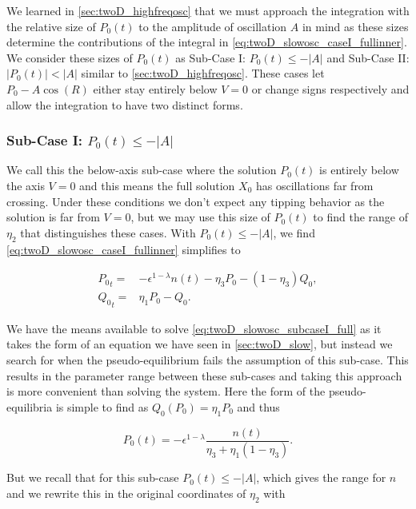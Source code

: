 We learned in \autoref{sec:twoD_highfreqosc} that we must approach the integration with the relative size of $P_0(t)$ to the amplitude of oscillation $A$ in mind as these sizes determine the contributions of the integral in \eqref{eq:twoD_slowosc_caseI_fullinner}. We consider these sizes of $P_0(t)$ as Sub-Case I: $P_0(t)\le -|A|$ and Sub-Case II:$|P_0(t)|<|A|$ similar to \autoref{sec:twoD_highfreqosc}. These cases let $P_0-A\cos(R)$ either stay entirely below $V=0$ or change signs respectively and allow the integration to have two distinct forms.

\subsubsection{Sub-Case I: $P_0(t)\le -|A|$}

We call this the below-axis sub-case where the solution $P_0(t)$ is entirely below the axis $V=0$ and this means the full solution $X_0$ has oscillations far from crossing. Under these conditions we don't expect any tipping behavior as the solution is far from $V=0$, but we may use this size of $P_0(t)$ to find the range of $\eta_2$ that distinguishes these cases. With $P_0(t)\le -|A|$, we find \eqref{eq:twoD_slowosc_caseI_fullinner} simplifies to

\begin{equation}\label{eq:twoD_slowosc_subcaseI_full}
\begin{aligned}
{P_0}_t =& -\epsilon^{1-\lambda} n(t) -\eta_3 P_0-(1-\eta_3)Q_0, \\
{Q_0}_t =& \eta_1 P_0-Q_0.
\end{aligned}
\end{equation}

We have the means available to solve \eqref{eq:twoD_slowosc_subcaseI_full} as it takes the form of an equation we have seen in \autoref{sec:twoD_slow}, but instead we search for when the pseudo-equilibrium fails the assumption of this sub-case. This results in the parameter range between these sub-cases and taking this approach is more convenient than solving the system. Here the form of the pseudo-equilibria is simple to find as $Q_0(P_0) = \eta_1P_0$ and thus 

\begin{equation*}
P_0(t) = -\epsilon^{1-\lambda}\frac{n(t)}{\eta_3+\eta_1(1-\eta_3)}.
\end{equation*}

But we recall that for this sub-case $P_0(t)\le -|A|$, which gives the range for $n$ and we rewrite this in the original coordinates of $\eta_2$ with

